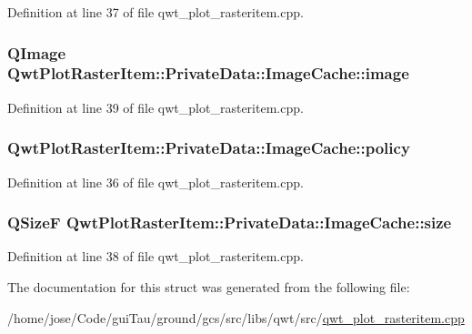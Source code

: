 Definition at line 37 of file qwt\-\_\-plot\-\_\-rasteritem.\-cpp.

\hypertarget{struct_qwt_plot_raster_item_1_1_private_data_1_1_image_cache_ac5a579f093728f9fbe4ce0810294d6a4}{
\subsubsection[{image}]{\setlength{\rightskip}{0pt plus 5cm}Q\-Image Qwt\-Plot\-Raster\-Item\-::\-Private\-Data\-::\-Image\-Cache\-::image}}\label{struct_qwt_plot_raster_item_1_1_private_data_1_1_image_cache_ac5a579f093728f9fbe4ce0810294d6a4}


Definition at line 39 of file qwt\-\_\-plot\-\_\-rasteritem.\-cpp.

\hypertarget{struct_qwt_plot_raster_item_1_1_private_data_1_1_image_cache_aab43bb6a7f0f02f4986a2ffe45f324dd}{
\subsubsection[{policy}]{ Qwt\-Plot\-Raster\-Item\-::\-Private\-Data\-::\-Image\-Cache\-::policy}}\label{struct_qwt_plot_raster_item_1_1_private_data_1_1_image_cache_aab43bb6a7f0f02f4986a2ffe45f324dd}


Definition at line 36 of file qwt\-\_\-plot\-\_\-rasteritem.\-cpp.

\hypertarget{struct_qwt_plot_raster_item_1_1_private_data_1_1_image_cache_a6c45e03703a65b4620c0c61b57f01ca1}{
\subsubsection[{size}]{\setlength{\rightskip}{0pt plus 5cm}Q\-Size\-F Qwt\-Plot\-Raster\-Item\-::\-Private\-Data\-::\-Image\-Cache\-::size}}\label{struct_qwt_plot_raster_item_1_1_private_data_1_1_image_cache_a6c45e03703a65b4620c0c61b57f01ca1}


Definition at line 38 of file qwt\-\_\-plot\-\_\-rasteritem.\-cpp.



The documentation for this struct was generated from the following file\-:\begin{DoxyCompactItemize}
\item 
/home/jose/\-Code/gui\-Tau/ground/gcs/src/libs/qwt/src/\hyperlink{qwt__plot__rasteritem_8cpp}{qwt\-\_\-plot\-\_\-rasteritem.\-cpp}\end{DoxyCompactItemize}
